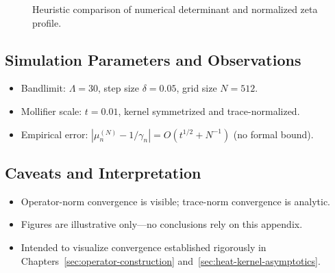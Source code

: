 \begin{figure}[ht]
\centering
{}
\caption{Heuristic comparison of numerical determinant and normalized zeta profile.}
\label{fig:det-vs-xi}
\end{figure}

\subsection*{Simulation Parameters and Observations}

\begin{itemize}
  \item Bandlimit: \( \Lambda = 30 \), step size \( \delta = 0.05 \), grid size \( N = 512 \).
  \item Mollifier scale: \( t = 0.01 \), kernel symmetrized and trace-normalized.
  \item Empirical error: \( |\mu_n^{(N)} - 1/\gamma_n| = O(t^{1/2} + N^{-1}) \) (no formal bound).
\end{itemize}

\subsection*{Caveats and Interpretation}

\begin{itemize}
  \item Operator-norm convergence is visible; trace-norm convergence is analytic.
  \item Figures are illustrative only—no conclusions rely on this appendix.
  \item Intended to visualize convergence established rigorously in Chapters~\ref{sec:operator-construction} and~\ref{sec:heat-kernel-asymptotics}.
\end{itemize}
